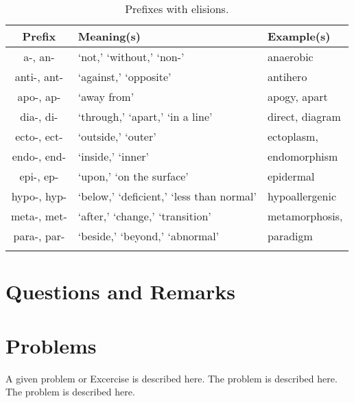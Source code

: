 \begin{longtable}{c | p{} | p{}}
    \caption{Prefixes with elisions.}
    \hline
    Prefix & Meaning(s) & Example(s) \\ \hline
        a-, an- & `not,' `without,' `non-' & anaerobic \\
        anti-, ant- & `against,' `opposite' & antihero \\
        apo-, ap- & `away from' & apogy, apart \\
        dia-, di- & `through,' `apart,' `in a line' & direct, diagram \\
        ecto-, ect- & `outside,' `outer' & ectoplasm, \\
        endo-, end- & `inside,' `inner' & endomorphism \\
        epi-, ep- & `upon,' `on the surface' & epidermal \\
        hypo-, hyp- & `below,' `deficient,' `less than normal' & hypoallergenic \\
        meta-, met- & `after,' `change,' `transition' & metamorphosis, \\
        para-, par- & `beside,' `beyond,' `abnormal' & paradigm \\ 
    \label{tab:Ch4Prefix2}
\end{longtable}

\section{Questions and Remarks}
\label{sec:QR4}






%
%
%


\section*{Problems}
%
\begin{prob}
\label{prob1}
A given problem or Excercise is described here. The
problem is described here. The problem is described here.
\end{prob}



